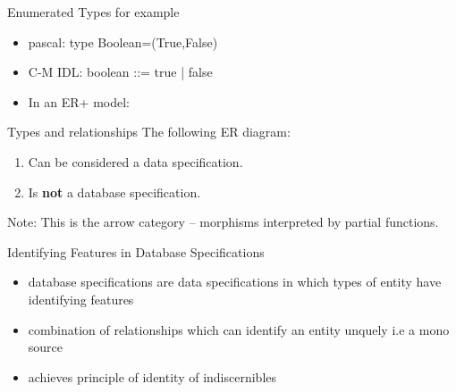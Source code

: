 \documentclass[xcolor=pst,dvips]{beamer}   %
\renewcommand{\erpictureFolder}[0]{../../SharedPictures}
\begin{document}
\iffalse
\begin{frame}{\textit{a priori}s}
\begin{itemize}
\item In language theory, formal grammars have terminals (and non-terminals)
\pause \item In data specifications, we have use of basic types string, integer, float, boolean and so on
              in addition maybe define enumerations 
\pause \item in categorical data types we have \textit{a priori}s i.e coproducts of terminal object
\pause \item In relational data models we have domains
\pause \item in ER models many-one relationships to the basic types are called attributes and are graphically distinct from other relationships
\end{itemize}
\end{frame}
\fi

\begin{frame}{Enumerated Types}
\pause for example
\begin{itemize} 
\pause \item pascal: type Boolean=(True,False)
\pause \item C-M IDL: boolean ::= true | false
\pause \item In an ER+ model:
\scalebox{0.85}{

}
\end{itemize}
\end{frame}

\begin{frame}{Types and relationships}
The following ER diagram:
\begin{center}
\scalebox{0.9}{

}
\end{center}
\begin{center}
\begin{enumerate}
\item Can be considered a data specification.
\item Is \textbf{not} a database specification. 
\end{enumerate}
\end{center}
Note: This is the arrow category -- morphisms interpreted by partial functions. 
\end{frame}

\begin{frame}{Identifying Features in Database Specifications}
\begin{itemize}
\item database specifications are data specifications in which types of entity have 
identifying features
\item combination of relationships which can identify an entity unquely
i.e a mono source
\item achieves principle of identity of indiscernibles
\end {itemize}
\end{frame}
\end{document}
